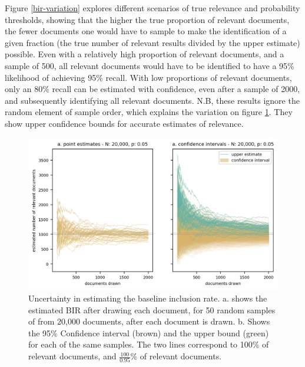 \documentclass{bmcart}
\begin{document}
	Figure \ref{bir-variation} explores different scenarios of true relevance and probability thresholds, showing that the higher the true proportion of relevant documents, the fewer documents one would have to sample to make the identification of a given fraction (the true number of relevant results divided by the upper estimate) possible. 
	Even with a relatively high proportion of relevant documents, and a sample of 500, all relevant documents would have to be identified to have a 95\% likelihood of achieving 95\% recall. 
	With low proportions of relevant documents, only an 80\% recall can be estimated with confidence, even after a sample of 2000, and subsequently identifying all relevant documents. 
	N.B, these results ignore the random element of sample order, which explains the variation on figure \ref{bir-sampling}. 
	They show upper confidence bounds for accurate estimates of relevance.

	\begin{figure}
	\includegraphics[width=\linewidth]{../images/bir_sampling.png}
	\caption{Uncertainty in estimating the baseline inclusion rate. a. shows the estimated BIR after drawing each document, for 50 random samples of from 20,000 documents, after each document is drawn. b. Shows the 95\% Confidence interval (brown) and the upper bound (green) for each of the same samples. The two lines correspond to 100\% of relevant documents, and $\frac{100}{0.95}$\% of relevant documents.}
	\label{bir-sampling}
\end{figure}
\end{document}
